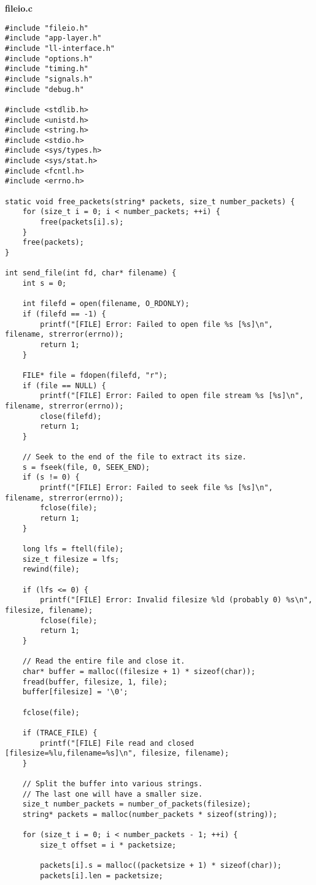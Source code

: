 \documentclass[subfiles]{main.tex}
\begin{document}
{\Large\textbf{fileio.c}}

\begin{lstlisting}[style=rcom]
#include "fileio.h"
#include "app-layer.h"
#include "ll-interface.h"
#include "options.h"
#include "timing.h"
#include "signals.h"
#include "debug.h"

#include <stdlib.h>
#include <unistd.h>
#include <string.h>
#include <stdio.h>
#include <sys/types.h>
#include <sys/stat.h>
#include <fcntl.h>
#include <errno.h>

static void free_packets(string* packets, size_t number_packets) {
	for (size_t i = 0; i < number_packets; ++i) {
		free(packets[i].s);
	}
	free(packets);
}

int send_file(int fd, char* filename) {
	int s = 0;
	
	int filefd = open(filename, O_RDONLY);
	if (filefd == -1) {
		printf("[FILE] Error: Failed to open file %s [%s]\n", filename, strerror(errno));
		return 1;
	}
	
	FILE* file = fdopen(filefd, "r");
	if (file == NULL) {
		printf("[FILE] Error: Failed to open file stream %s [%s]\n", filename, strerror(errno));
		close(filefd);
		return 1;
	}
	
	// Seek to the end of the file to extract its size.
	s = fseek(file, 0, SEEK_END);
	if (s != 0) {
		printf("[FILE] Error: Failed to seek file %s [%s]\n", filename, strerror(errno));
		fclose(file);
		return 1;
	}
	
	long lfs = ftell(file);
	size_t filesize = lfs;
	rewind(file);
	
	if (lfs <= 0) {
		printf("[FILE] Error: Invalid filesize %ld (probably 0) %s\n", filesize, filename);
		fclose(file);
		return 1;
	}
	
	// Read the entire file and close it.
	char* buffer = malloc((filesize + 1) * sizeof(char));
	fread(buffer, filesize, 1, file);
	buffer[filesize] = '\0';
	
	fclose(file);
	
	if (TRACE_FILE) {
		printf("[FILE] File read and closed [filesize=%lu,filename=%s]\n", filesize, filename);
	}
	
	// Split the buffer into various strings.
	// The last one will have a smaller size.
	size_t number_packets = number_of_packets(filesize);
	string* packets = malloc(number_packets * sizeof(string));
	
	for (size_t i = 0; i < number_packets - 1; ++i) {
		size_t offset = i * packetsize;
		
		packets[i].s = malloc((packetsize + 1) * sizeof(char));
		packets[i].len = packetsize;
		

\end{lstlisting}
\end{document}
